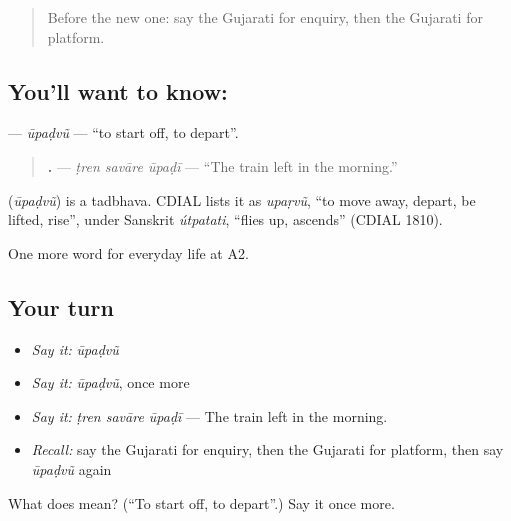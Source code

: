 \begin{quote}
Before the new one: say the Gujarati for enquiry, then the Gujarati for platform.
\end{quote}

\subsection*{You'll want to know: }
\textbf{} — \emph{ūpaḍvũ} — \textquotedblleft{}to start off, to depart\textquotedblright{}.

\begin{quote}
\textbf{  .} — \emph{ṭren savāre ūpaḍī} — \textquotedblleft{}The train left in the morning.\textquotedblright{}
\end{quote}

\begin{cousinweb}
\textbf{} (\emph{ūpaḍvũ}) is a tadbhava. CDIAL lists it as \emph{upaṛvũ}, \textquotedblleft{}to move away, depart, be lifted, rise\textquotedblright{}, under Sanskrit \emph{útpatati}, \textquotedblleft{}flies up, ascends\textquotedblright{} (CDIAL 1810).
\end{cousinweb}

\begin{grammarlens}[title={What you've built}]
One more word for everyday life at A2.
\end{grammarlens}

\subsection*{Your turn}
\begin{itemize}
\raggedright
  \item \emph{Say it:} \emph{ūpaḍvũ}
  \item \emph{Say it:} \emph{ūpaḍvũ}, once more
  \item \emph{Say it:} \emph{ṭren savāre ūpaḍī} — The train left in the morning.
  \item \emph{Recall:} say the Gujarati for enquiry, then the Gujarati for platform, then say \emph{ūpaḍvũ} again
\end{itemize}

\begin{tcolorbox}[breakable,colback=teal!4,colframe=teal!35!black,title={Before you move on}]
What does  mean? (\textquotedblleft{}To start off, to depart\textquotedblright{}.) Say it once more.
\end{tcolorbox}
